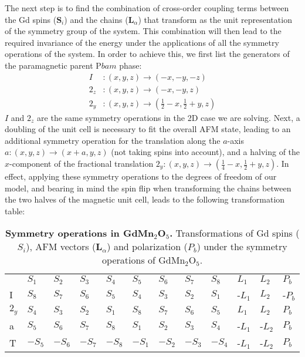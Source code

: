 The next step is to find the combination of cross-order coupling terms between the Gd spins ($\bm S_i$) and the chains ($\bm L_\alpha$) that transform as the unit representation of the symmetry group of the system.
This combination will then lead to the required invariance of the energy under the applications of all the symmetry operations of the system.
In order to achieve this, we first list the generators of the paramagnetic parent P$bam$ phase:
\begin{align}
	I &: (x, y, z) \rightarrow (-x, -y, -z)\\
	2_z &: (x, y, z) \rightarrow (-x, -y, z)\\
	2_y &: (x, y, z) \rightarrow (\frac{1}{2} - x, \frac{1}{2} + y, z)
\end{align}
$I$ and $2_z$ are the same symmetry operations in the 2D case we are solving.
Next, a doubling of the unit cell is necessary to fit the overall \gls{AFM} state, leading to an additional symmetry operation for the translation along the $a$-axis $a: (x, y, z) \rightarrow (x + a, y, z)$ (not taking spins into account), and a halving of the $x$-component of the fractional translation $2_y: (x, y, z) \rightarrow (\frac{1}{4} - x, \frac{1}{2}+y, z)$.
In effect, applying these symmetry operations to the degrees of freedom of our model, and bearing in mind the spin flip when transforming the chains between the two halves of the magnetic unit cell, leads to the following transformation table:
\begin{table}[h]
\centering
\begin{tabular}{|l|lllllllllll|}
\cline{1-12}
 & $S_1$ & $S_2$ & $S_3$ & $S_4$ & $S_5$ & $S_6$ & $S_7$ & $S_8$ & $L_1$ & $L_2$ & $P_b$ \\ \cline{1-12}
I & $S_8$ & $S_7$ & $S_6$ & $S_5$ & $S_4$ & $S_3$ & $S_2$ & $S_1$ & -$L_1$ & $L_2$ & -$P_b$ \\ \cline{1-12}
$2_y$ & $S_4$ & $S_3$ & $S_2$ & $S_1$ & $S_8$ & $S_7$ & $S_6$ & $S_5$ & $L_1$ & $L_2$ & $P_b$ \\ \cline{1-12}
a & $S_5$ & $S_6$ & $S_7$ & $S_8$ & $S_1$ & $S_2$ & $S_3$ & $S_4$ & -$L_1$ & -$L_2$ & $P_b$ \\ \cline{1-12}
T & $-S_5$ & $-S_6$ & $-S_7$ & $-S_8$ & $-S_1$ & $-S_2$ & $-S_3$ & $-S_4$ & -$L_1$ & -$L_2$ & $P_b$ \\ \cline{1-12}
\end{tabular}
\caption{\label{tab:GdMn2O5_symm}{\bf Symmetry operations in GdMn$_2$O$_5$.} Transformations of Gd spins ($S_i$), \gls{AFM} vectors ($\bm L_\alpha$) and polarization ($P_b$) under the symmetry operations of GdMn$_2$O$_5$.}
\end{table}
